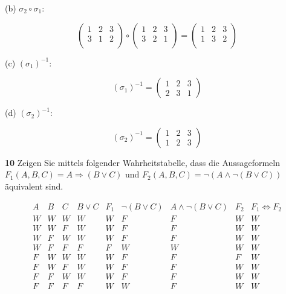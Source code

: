 \documentclass[11pt]{article}
\begin{document}
{{(b) $\sigma_{2} \circ \sigma_{1}$:

    \[
        \begin{pmatrix}
            1 & 2 & 3 \\
            3 & 1 & 2 \\
        \end{pmatrix}
        \circ
        \begin{pmatrix}
            1 & 2 & 3 \\
            3 & 2 & 1 \\
        \end{pmatrix}
        =
        \begin{pmatrix}
            1 & 2 & 3 \\
            1 & 3 & 2 \\
        \end{pmatrix}
    \]

(c) $(\sigma_{1})^{-1}$:

\[
    (\sigma_{1})^{-1} = \begin{pmatrix} 1 & 2 & 3 \\ 2 & 3 & 1 \end{pmatrix}
\]

(d) $(\sigma_{2})^{-1}$:

\[
    (\sigma_{2})^{-1} = \begin{pmatrix} 1 & 2 & 3 \\ 1 & 2 & 3 \end{pmatrix}
\]


\textbf{10} Zeigen Sie mittels folgender Wahrheitstabelle, dass die Aussageformeln $F_1(A,B,C) = A \Rightarrow (B \lor C)$ und $F_2(A,B,C) = \neg(A \land \neg(B \lor C))$ äquivalent sind.

\[
    \begin{array}{ccc|c|c|c|c|c|c}
        A & B & C & B \lor C & F_1 & \neg(B \lor C) & A \land \neg(B \lor C) & F_2 & F_1 \Leftrightarrow F_2 \\
        \hline
        W & W & W & W & W & F & F & W & W \\
        W & W & F & W & W & F & F & W & W \\
        W & F & W & W & W & F & F & W & W \\
        W & F & F & F & F & W & W & W & W \\
        F & W & W & W & W & F & F & F & W \\
        F & W & F & W & W & F & F & W & W \\
        F & F & W & W & W & F & F & W & W \\
        F & F & F & F & W & W & F & W & W \\
    \end{array}
\]

}}
\end{document}
